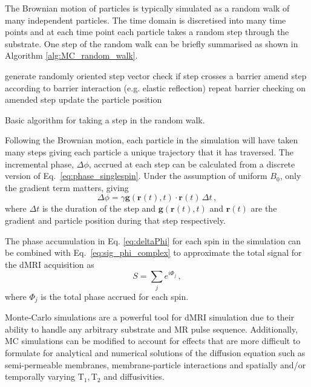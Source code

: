 The Brownian motion of particles is typically simulated as a random walk of many independent particles. The time domain is discretised into many time points and at each time point each particle takes a random step through the substrate.  
One step of the random walk can be briefly summarised as shown in Algorithm \ref{alg:MC_random_walk}.
\begin{algorithm}
\begin{algorithmic}
  \State generate randomly oriented step vector
  \State check if step crosses a barrier 
  \State amend step according to barrier interaction (e.g. elastic reflection)
  \State repeat barrier checking on amended step
  \EndWhile
  \State update the particle position 
   \end{algorithmic}
   \caption{Basic algorithm for taking a step in the random walk.}
   \label{alg:MC_random_walk}
 \end{algorithm}
 
Following the Brownian motion, each particle in the simulation will have taken many steps giving each particle a unique trajectory that it has traversed.
The incremental phase, $\Delta \phi$, accrued at each step can be calculated from a discrete version of Eq.\ \ref{eq:phase_singlespin}. Under the assumption of uniform $B_0$, only the gradient term matters, giving
\begin{equation}
  \Delta \phi = \gamma \mathbf{g}(\mathbf{r}(t), t) \cdot \mathbf{r}(t)\, \Delta t \,,
  \label{eq:deltaPhi}
\end{equation}
where $\Delta t$ is the duration of the step and $\mathbf{g}(\mathbf{r}(t), t)$ and $\mathbf{r}(t)$ are the gradient and particle position during that step respectively.

The phase accumulation in Eq. \ref{eq:deltaPhi} for each spin in the simulation can be combined with Eq.\ \ref{eq:sig_phi_complex} to approximate the total signal for the \ac{dMRI} acquisition as
\begin{equation}
  S = \sum_j e^{i\Phi_j}\,,
  \label{eq:MCsignal}
\end{equation}
where $\Phi_j$ is the total phase accrued for each spin. 

Monte-Carlo simulations are a powerful tool for \ac{dMRI} simulation due to their ability to handle any arbitrary substrate and MR pulse sequence.
Additionally, \ac{MC} simulations can be modified to account for effects that are more difficult to formulate for analytical and numerical solutions of the diffusion equation such as semi-permeable membranes, membrane-particle interactions and spatially and/or temporally varying $\mathrm{T_1, T_2}$ and diffusivities.

